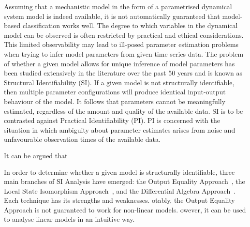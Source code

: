 Assuming that a mechanistic model in the form of a parametrised dynamical system model is indeed available,  it is not automatically guaranteed that model-based classification works well.
The degree to which variables in the dynamical model can be observed is often restricted by practical and ethical considerations. 
This limited observability may lead to ill-posed parameter estimation problems when trying to infer model parameters from given time series data.
The problem of  whether a given model allows for unique inference of model parameters has been studied extensively in the literature over the past 50 years and is known as Structural Identifiability (SI).
If a given model is not structurally identifiable, then multiple parameter configurations will produce identical input-output behaviour of the model. 
It follows that parameters cannot be meaningfully estimated, regardless of the amount and quality of the available data. 
SI is to be contrasted against Practical Identifiability (PI).
PI is concerned with the situation in which ambiguity about parameter estimates arises from noise and unfavourable observation times of the available data. 

It can be argued that

In order to determine whether a given model is structurally identifiable, three main branches of SI Analysis have emerged: 
the Output Equality Approach~\cite{bellman1970structural, pohjanpalo1978system, walter1996identifiability}, 
the Local State Isomorphism Approach~\cite{tunali1987new, vajda1989state, sussmann1976existence}, and 
the Differential Algebra Approach~\cite{diop1991nonlinear, ljung1994global, jain2019priori}. 
Each technique has its strengths and weaknesses.
otably, the Output Equality Approach is not guaranteed to work for non-linear models.
owever, it can be used to analyse linear models in an intuitive way.

